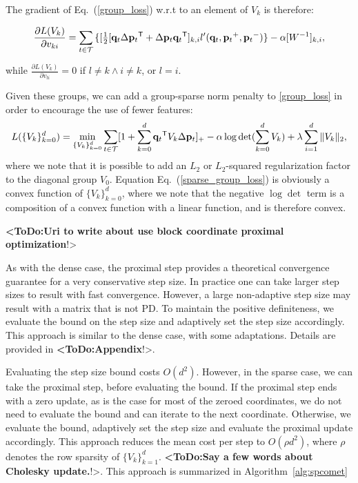 \documentclass[twoside,11pt]{article}
\newcommand\todo[1]{\textbf{<ToDo:#1}!>}
\newcommand\mat[1]{{#1}}
\renewcommand\vec[1]{\mathbf{#1}}
\newcommand{\T}{{}^\mathsf{T}}
\newcommand{\W}{\mat{W}}
\newcommand{\q}{{\vec{q}}}
\newcommand{\p}{{\vec{p}}}
\newcommand{\trip}{{t}}
\newcommand{\qt}{{\q_{\trip}}}
\newcommand{\pt}{{\p_{\trip}}}
\newcommand{\triplet}{(\qt, \pt^{+}, \pt^{-})}
\newcommand{\Vk}{\mat{V_k}}
\newcommand{\Vg}{\{\Vk\}_{k=0}^{d}} %
\newcommand{\Vgrc}{\{\Vk\}_{k=1}^{d}} %
\renewcommand{\eqref}[1]{Eq.~(\ref{#1})}
\begin{document}
The gradient of \eqref{group_loss} w.r.t to an element of $\mat{V}_k$ is therefore:

\begin{equation}
  \frac{\partial {L (V_k)}}{\partial v_{ki}} = \sum\limits_{t\in \cal{T}}{\{
  [\tfrac{1}{2}[\q_{t}\Delta\p_{t}\T + \Delta\p_{t}\q_{t}\T]_{k,i}  }
  {l'}\triplet\} - \alpha [\W^{-1}]_{k,i},
  \label{grad_group}
\end{equation}

while $\frac{\partial {L (V_k)}}{\partial v_{li}}=0$ if  $l \neq k \wedge i \neq k$, or $l=i$.

Given these groups, we can add a group-sparse norm penalty to  \ref{group_loss} in order to encourage the use of fewer features:
\begin{equation}
L(\Vg) = 
  \min_{\Vg} \sum_{\trip \in \cal{T}}  [1+\sum_{k=0}^{d}{\qt\T \Vk\Delta \vec{p}_t } ]_{+} - \alpha \log \det(\sum_{k=0}^{d}{\Vk}) + \lambda \sum_{i=1}^d \|V_k\|_2,
  \label{sparse_group_loss}
\end{equation} 
where we note that it is possible to add an $L_2$ or $L_2$-squared regularization factor to the diagonal group $V_0$. Equation \eqref{sparse_group_loss} is obviously a convex function of $\Vg$, where we note that the negative $\log \det$ term is a composition of a convex function with a linear function, and is therefore convex.

\todo{Uri to write about use block coordinate proximal optimization}

As with the dense case, the proximal step provides a theoretical convergence guarantee for a very conservative step size. In practice one can take larger step sizes to result with fast convergence. However, a large non-adaptive step size may result with a matrix that is not PD. To maintain the positive definiteness, we evaluate the bound on the step size and adaptively set the step size accordingly. This approach is similar to the dense case, with some adaptations. Details are provided in \todo{Appendix}. 

Evaluating the step size bound costs $O(d^2)$. However, in the sparse case, we can take the proximal step, before evaluating the bound. If the proximal step ends with a zero update, as is the case for most of the zeroed coordinates, we do not need to evaluate the bound and can iterate to the next coordinate. Otherwise, we evaluate the bound, adaptively set the step size and evaluate the proximal update accordingly. This approach reduces the mean cost per step to $O(\rho d^2)$, where $\rho$ denotes the row sparsity of $\Vgrc$. \todo{Say a few words about Cholesky update.}. This approach is summarized in Algorithm~\ref{alg:spcomet}
\end{document}
